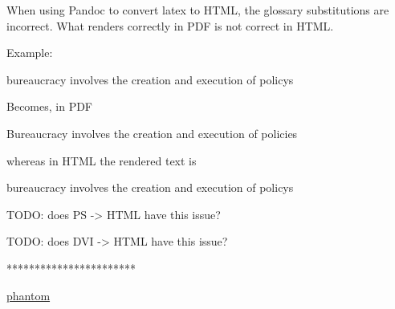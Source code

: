 When using Pandoc to convert latex to HTML, the glossary substitutions are incorrect. 
What renders correctly in PDF is not correct in HTML. 

Example:

\Gls{bureaucracy} involves the creation and execution of \glspl{policy}

Becomes, in PDF

Bureaucracy involves the creation and execution of policies

whereas in HTML the rendered text is

bureaucracy involves the creation and execution of policys


TODO: does PS -> HTML have this issue?

TODO: does DVI -> HTML have this issue?

***********************

\href{https://en.wikibooks.org/wiki/LaTeX/Document_Structure#Section_numbering}{phantom}